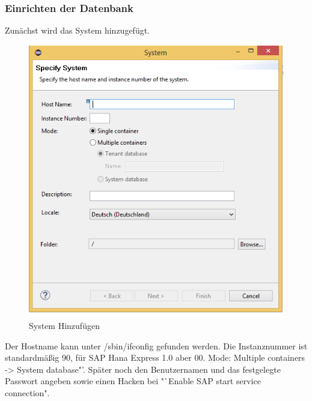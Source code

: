 \documentclass[a4paper, 12pt]{scrartcl}
\begin{document}
\subsubsection{Einrichten der Datenbank}
Zunächst wird das System hinzugefügt. 

\begin{figure}[H]
\centering
\includegraphics[height=12cm, width=15cm, keepaspectratio]{hanadb1.png}
\caption{System Hinzufügen}
\end{figure}    

      Der Hostname kann unter /sbin/ifconfig gefunden werden.
Die Instanznummer ist standardmäßig 90, für SAP Hana Express 1.0 aber 00.
Mode: Multiple containers -> System database"'. Später noch den Benutzernamen und das festgelegte Passwort angeben sowie einen Hacken bei "`Enable SAP start service connection".
\end{document}
